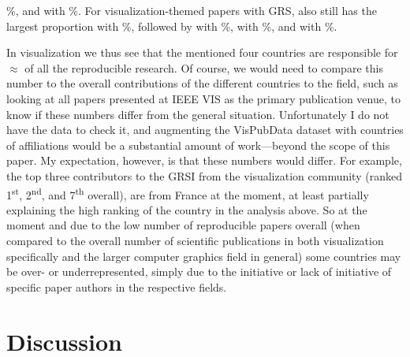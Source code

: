 \documentclass[conference,svgnames]{vgtc}                     %
\begin{document}
\GrsiCountryPieChartOverallSeniorNoThreePercentage{}\%, and \GrsiCountryPieChartOverallSeniorNoFourName{} with \GrsiCountryPieChartOverallSeniorNoFourPercentage{}\%. For visualization-themed papers with GRS, \GrsiCountryPieChartVisSeniorNoOneName{} also still has the largest proportion with \GrsiCountryPieChartVisSeniorNoOnePercentage{}\%, followed by \GrsiCountryPieChartVisSeniorNoTwoName{} with \GrsiCountryPieChartVisSeniorNoTwoPercentage{}\%, \GrsiCountryPieChartVisSeniorNoThreeName{} with \GrsiCountryPieChartVisSeniorNoThreePercentage{}\%, and \GrsiCountryPieChartVisSeniorNoFourName{} with \GrsiCountryPieChartVisSeniorNoFourPercentage{}\%.

In visualization we thus see that the mentioned four countries are responsible for $\approx$  of all the reproducible research. Of course, we would need to compare this number to the overall contributions of the different countries to the field, such as looking at all papers presented at IEEE VIS as the primary publication venue, to know if these numbers differ from the general situation. Unfortunately I do not have the data to check it, and augmenting the VisPubData dataset \cite{Isenberg:2017:VMC} with countries of affiliations would be a substantial amount of work---be\-yond the scope of this paper. My expectation, however, is that these numbers would differ. For example, the top three contributors to the GRSI from the visualization community (ranked 1\textsuperscript{st}, 2\textsuperscript{nd}, and 7\textsuperscript{th} overall), are from France at the moment, at least partially explaining the high ranking of the country in the analysis above. So at the moment and due to the low number of reproducible papers overall (when compared to the overall number of scientific publications in both visualization specifically and the larger computer graphics field in general) some countries may be over- or underrepresented, simply due to the initiative or lack of initiative of specific paper authors in the respective fields.

\section{Discussion}
\label{sec:discussion}
\end{document}
